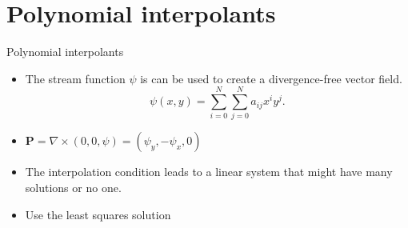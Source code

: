 \documentclass{beamer}
\begin{document}
\section{Polynomial interpolants}
\begin{frame}{Polynomial interpolants}
  \begin{itemize}
    \item The stream function $\psi$ is can be used to create a divergence-free
      vector field.
      \begin{equation*}
	\psi(x,y) = \sum_{i=0}^N\sum_{j=0}^N a_{ij}x^i y^j.
      \end{equation*}
    
    \item $\mathbf{P} = \nabla \times (0,0,\psi) = (\psi_y,-\psi_x,0)$

    \item The interpolation condition leads to a linear system that might have
      many solutions or no one.

    \item Use the least squares solution
  \end{itemize}
\end{frame}
\end{document}
